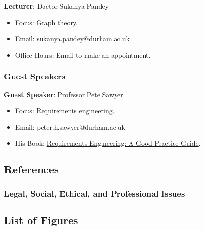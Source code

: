\textbf{Lecturer}: Doctor Sukanya Pandey

\begin{itemize}\label{lecturer-software-engineering-sukanyapandey}
    \item Focus: Graph theory.
    \item Email: sukanya.pandey@durham.ac.uk
    \item Office Hours: Email to make an appointment.
\end{itemize}

\subsubsection{Guest Speakers}

\textbf{Guest Speaker}: Professor Pete Sawyer

\begin{itemize}\label{guest-pete-sawyer}
    \item Focus: Requirements engineering.
    \item Email: peter.h.sawyer@durham.ac.uk
    \item His Book: \hyperref[cit:Requirements Engineering]{Requirements Engineering: A Good Practice Guide}.
\end{itemize}

\subsection{References}

\subsubsection{Legal, Social, Ethical, and Professional Issues}




\subsection{List of Figures}

